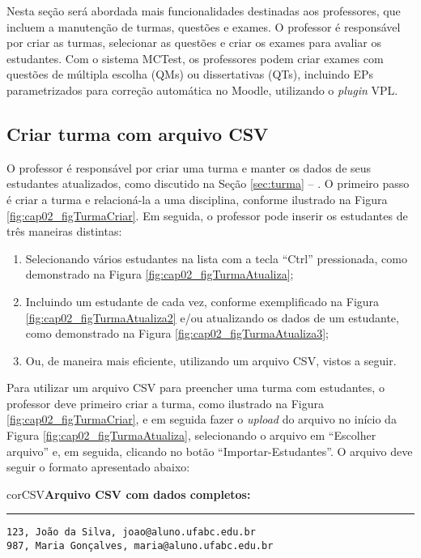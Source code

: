 Nesta seção será abordada mais funcionalidades destinadas aos professores, que incluem a manutenção de turmas, questões e exames. O professor é responsável por criar as turmas, selecionar as questões e criar os exames para avaliar os estudantes. Com o sistema MCTest, os professores podem criar exames com questões de múltipla escolha (QMs) ou dissertativas (QTs), incluindo EPs parametrizados para correção automática no Moodle, utilizando o \textit{plugin} VPL.

\subsection{Criar turma com arquivo CSV}\label{sec:professorCriarTurma}

O professor é responsável por criar uma turma e manter os dados de seus estudantes atualizados, como discutido na Seção \ref{sec:turma} -- . O primeiro passo é criar a turma e relacioná-la a uma disciplina, conforme ilustrado na Figura \ref{fig:cap02_figTurmaCriar}. Em seguida, o professor pode inserir os estudantes de três maneiras distintas:

\begin{enumerate}
    \item  Selecionando vários estudantes na lista com a tecla ``Ctrl'' pressionada, como demonstrado na Figura \ref{fig:cap02_figTurmaAtualiza};
    \item Incluindo um estudante de cada vez, conforme exemplificado na Figura \ref{fig:cap02_figTurmaAtualiza2} e/ou atualizando os dados de um estudante, como demonstrado na Figura \ref{fig:cap02_figTurmaAtualiza3}; 
    \item Ou, de maneira mais eficiente, utilizando um arquivo CSV, vistos a seguir.
\end{enumerate}

Para utilizar um arquivo CSV para preencher uma turma com estudantes, o professor deve primeiro criar a turma, como ilustrado na Figura \ref{fig:cap02_figTurmaCriar}, e em seguida fazer o \textit{upload} do arquivo no início da Figura \ref{fig:cap02_figTurmaAtualiza}, selecionando o arquivo em ``Escolher arquivo'' e, em seguida, clicando no botão ``Importar-Estudantes''. O arquivo deve seguir o formato apresentado abaixo:

\begin{myboxCode}{corCSV}{\textbf{Arquivo CSV com dados completos:}}\vspace{3mm}
\hrule
\begin{verbatim}
123, João da Silva, joao@aluno.ufabc.edu.br
987, Maria Gonçalves, maria@aluno.ufabc.edu.br
\end{verbatim}
\end{myboxCode}


